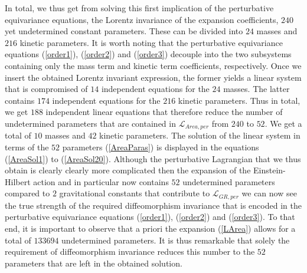 \documentclass[a4paper,12pt, DIV=14, BCOR=5mm, twoside, headsepline, numbers=noenddot]{scrbook}
\begin{document}
In total, we thus get from solving this first implication of the perturbative equivariance equations, the Lorentz invariance of the expansion coefficients, $240$ yet undetermined constant parameters. These can be divided into $24$ masses and $216$ kinetic parameters. It is worth noting that the perturbative equivariance equations (\ref{order1}), (\ref{order2}) and (\ref{order3}) decouple into the two subsystems containing only the mass term and kinetic term coefficients, respectively. Once we insert the obtained Lorentz invariant expression, the former yields a linear system that is compromised of $14$ independent equations for the $24$ masses. The latter contains $174$ independent equations for the $216$ kinetic parameters. Thus in total, we get $188$ independent linear equations that therefore reduce the number of undetermined parameters that are contained in $\mathcal{L}_{Area,per}$ from $240$ to $52$. We get a total of $10$ masses and $42$ kinetic parameters. The solution of the linear system in terms of the $52$ parameters (\ref{AreaParas}) is displayed in the equations (\ref{AreaSol1}) to (\ref{AreaSol20}). Although the perturbative Lagrangian that we thus obtain is clearly clearly more complicated then the expansion of the Einstein-Hilbert action and in particular now contains $52$ undetermined parameters compared to $2$ gravitational constants that contribute to $\mathcal{L}_{GR,per}$ we can now see the true strength of the required diffeomorphism invariance that is encoded in the perturbative equivariance equations (\ref{order1}), (\ref{order2}) and (\ref{order3}). To that end, it is important to observe that a priori the expansion (\ref{LArea}) allows for a total of $133694$ undetermined parameters. It is thus remarkable that solely the requirement of diffeomorphism invariance reduces this number to the $52$ parameters that are left in the obtained solution. 
\end{document}
